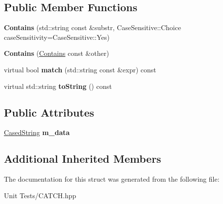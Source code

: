 \subsection*{Public Member Functions}
\begin{DoxyCompactItemize}
\item 
{\bfseries Contains} (std\+::string const \&substr, Case\+Sensitive\+::\+Choice case\+Sensitivity=Case\+Sensitive\+::\+Yes)\hypertarget{structCatch_1_1Matchers_1_1Impl_1_1StdString_1_1Contains_a7a062d83bd3e3075929dbb55e1c24258}{}\label{structCatch_1_1Matchers_1_1Impl_1_1StdString_1_1Contains_a7a062d83bd3e3075929dbb55e1c24258}

\item 
{\bfseries Contains} (\hyperlink{structCatch_1_1Matchers_1_1Impl_1_1StdString_1_1Contains}{Contains} const \&other)\hypertarget{structCatch_1_1Matchers_1_1Impl_1_1StdString_1_1Contains_ad6b1ef653dfcb3bab43c43be043dc4e8}{}\label{structCatch_1_1Matchers_1_1Impl_1_1StdString_1_1Contains_ad6b1ef653dfcb3bab43c43be043dc4e8}

\item 
virtual bool {\bfseries match} (std\+::string const \&expr) const \hypertarget{structCatch_1_1Matchers_1_1Impl_1_1StdString_1_1Contains_aa27d823dea5770025a24424fc3355a6f}{}\label{structCatch_1_1Matchers_1_1Impl_1_1StdString_1_1Contains_aa27d823dea5770025a24424fc3355a6f}

\item 
virtual std\+::string {\bfseries to\+String} () const \hypertarget{structCatch_1_1Matchers_1_1Impl_1_1StdString_1_1Contains_a226755351f3598179925f3ab89d6def7}{}\label{structCatch_1_1Matchers_1_1Impl_1_1StdString_1_1Contains_a226755351f3598179925f3ab89d6def7}

\end{DoxyCompactItemize}
\subsection*{Public Attributes}
\begin{DoxyCompactItemize}
\item 
\hyperlink{structCatch_1_1Matchers_1_1Impl_1_1StdString_1_1CasedString}{Cased\+String} {\bfseries m\+\_\+data}\hypertarget{structCatch_1_1Matchers_1_1Impl_1_1StdString_1_1Contains_a419a9ecaeaa417d4987982402e08b3eb}{}\label{structCatch_1_1Matchers_1_1Impl_1_1StdString_1_1Contains_a419a9ecaeaa417d4987982402e08b3eb}

\end{DoxyCompactItemize}
\subsection*{Additional Inherited Members}


The documentation for this struct was generated from the following file\+:\begin{DoxyCompactItemize}
\item 
Unit Tests/C\+A\+T\+C\+H.\+hpp\end{DoxyCompactItemize}
